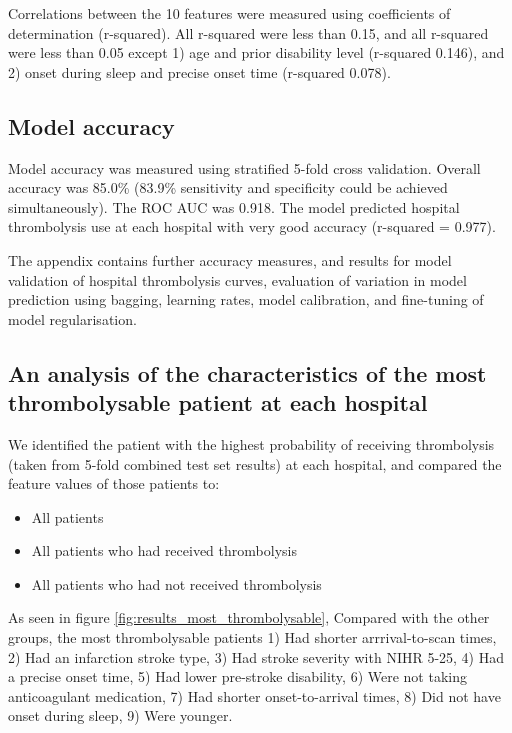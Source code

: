 Correlations between the 10 features were measured using coefficients of determination (r-squared). All r-squared were less than 0.15, and all r-squared were less than 0.05 except 1) age and prior disability level (r-squared 0.146), and 2) onset during sleep and precise onset time (r-squared 0.078).


\subsection{Model accuracy}

Model accuracy was measured using stratified 5-fold cross validation. Overall accuracy was 85.0\% (83.9\% sensitivity and specificity could be achieved simultaneously). The ROC AUC was 0.918. The model predicted hospital thrombolysis use at each hospital with very good accuracy (r-squared = 0.977).

The appendix contains further accuracy measures, and results for model validation of hospital thrombolysis curves, evaluation of variation in model prediction using bagging, learning rates, model calibration, and fine-tuning of model regularisation.


\subsection{An analysis of the characteristics of the most thrombolysable patient at each hospital}

We identified the patient with the highest probability of receiving thrombolysis (taken from 5-fold combined test set results) at each hospital, and compared the feature values of those patients to:

\begin{itemize}
    \item All patients
    \item All patients who had received thrombolysis
    \item All patients who had not received thrombolysis
\end{itemize}

As seen in figure \ref{fig:results_most_thrombolysable}, Compared with the other groups, the most thrombolysable patients 1) Had shorter arrrival-to-scan times, 2) Had an infarction stroke type, 3) Had stroke severity with NIHR 5-25, 4) Had a precise onset time, 5) Had lower pre-stroke disability, 6) Were not taking anticoagulant medication, 7) Had shorter onset-to-arrival times, 8) Did not have onset during sleep, 9) Were younger.

